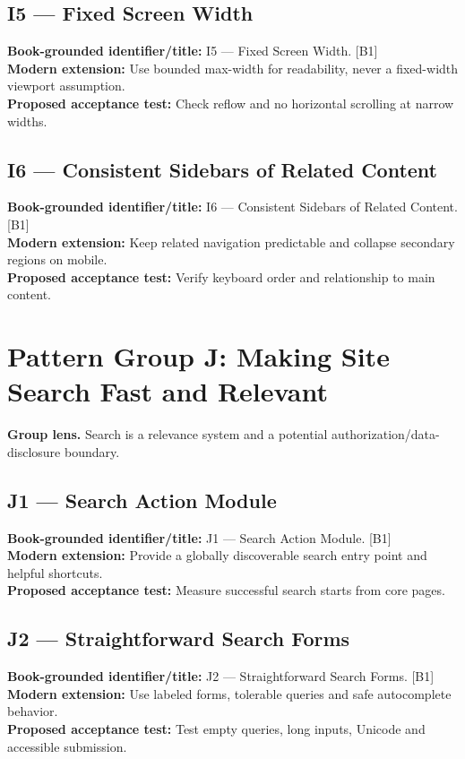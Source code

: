 \documentclass[11pt]{article}
\begin{document}
\subsection{I5 — Fixed Screen Width}
\noindent\textcolor{Ocean}{\textbf{Book-grounded identifier/title:}} I5 — Fixed Screen Width. [B1]\\
\textcolor{Mint}{\textbf{Modern extension:}} Use bounded max-width for readability, never a fixed-width viewport assumption.\\
\textcolor{Amber}{\textbf{Proposed acceptance test:}} Check reflow and no horizontal scrolling at narrow widths.\medskip
\subsection{I6 — Consistent Sidebars of Related Content}
\noindent\textcolor{Ocean}{\textbf{Book-grounded identifier/title:}} I6 — Consistent Sidebars of Related Content. [B1]\\
\textcolor{Mint}{\textbf{Modern extension:}} Keep related navigation predictable and collapse secondary regions on mobile.\\
\textcolor{Amber}{\textbf{Proposed acceptance test:}} Verify keyboard order and relationship to main content.\medskip
\section{Pattern Group J: Making Site Search Fast and Relevant}

\begin{notebox}\textbf{Group lens.} Search is a relevance system and a potential authorization/data-disclosure boundary.\end{notebox}
\subsection{J1 — Search Action Module}
\noindent\textcolor{Ocean}{\textbf{Book-grounded identifier/title:}} J1 — Search Action Module. [B1]\\
\textcolor{Mint}{\textbf{Modern extension:}} Provide a globally discoverable search entry point and helpful shortcuts.\\
\textcolor{Amber}{\textbf{Proposed acceptance test:}} Measure successful search starts from core pages.\medskip
\subsection{J2 — Straightforward Search Forms}
\noindent\textcolor{Ocean}{\textbf{Book-grounded identifier/title:}} J2 — Straightforward Search Forms. [B1]\\
\textcolor{Mint}{\textbf{Modern extension:}} Use labeled forms, tolerable queries and safe autocomplete behavior.\\
\textcolor{Amber}{\textbf{Proposed acceptance test:}} Test empty queries, long inputs, Unicode and accessible submission.\medskip
\end{document}
